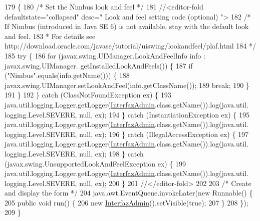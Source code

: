 \begin{DoxyCode}
179                                            \{
180         \textcolor{comment}{/* Set the Nimbus look and feel */}
181         \textcolor{comment}{//<editor-fold defaultstate="collapsed" desc=" Look and feel setting code (optional) ">}
182         \textcolor{comment}{/* If Nimbus (introduced in Java SE 6) is not available, stay with the default look and feel.}
183 \textcolor{comment}{         * For details see http://download.oracle.com/javase/tutorial/uiswing/lookandfeel/plaf.html }
184 \textcolor{comment}{         */}
185         \textcolor{keywordflow}{try} \{
186             \textcolor{keywordflow}{for} (javax.swing.UIManager.LookAndFeelInfo info : javax.swing.UIManager.
      getInstalledLookAndFeels()) \{
187                 \textcolor{keywordflow}{if} (\textcolor{stringliteral}{"Nimbus"}.equals(info.getName())) \{
188                     javax.swing.UIManager.setLookAndFeel(info.getClassName());
189                     \textcolor{keywordflow}{break};
190                 \}
191             \}
192         \} \textcolor{keywordflow}{catch} (ClassNotFoundException ex) \{
193             java.util.logging.Logger.getLogger(\mbox{\hyperlink{class_interfaz_package_1_1_interfaz_admin_a314844323c7cc2133f2e6e27e437f3c7}{InterfazAdmin}}.class.getName()).log(java.util.
      logging.Level.SEVERE, null, ex);
194         \} \textcolor{keywordflow}{catch} (InstantiationException ex) \{
195             java.util.logging.Logger.getLogger(\mbox{\hyperlink{class_interfaz_package_1_1_interfaz_admin_a314844323c7cc2133f2e6e27e437f3c7}{InterfazAdmin}}.class.getName()).log(java.util.
      logging.Level.SEVERE, null, ex);
196         \} \textcolor{keywordflow}{catch} (IllegalAccessException ex) \{
197             java.util.logging.Logger.getLogger(\mbox{\hyperlink{class_interfaz_package_1_1_interfaz_admin_a314844323c7cc2133f2e6e27e437f3c7}{InterfazAdmin}}.class.getName()).log(java.util.
      logging.Level.SEVERE, null, ex);
198         \} \textcolor{keywordflow}{catch} (javax.swing.UnsupportedLookAndFeelException ex) \{
199             java.util.logging.Logger.getLogger(\mbox{\hyperlink{class_interfaz_package_1_1_interfaz_admin_a314844323c7cc2133f2e6e27e437f3c7}{InterfazAdmin}}.class.getName()).log(java.util.
      logging.Level.SEVERE, null, ex);
200         \}
201         \textcolor{comment}{//</editor-fold>}
202 
203         \textcolor{comment}{/* Create and display the form */}
204         java.awt.EventQueue.invokeLater(\textcolor{keyword}{new} Runnable() \{
205             \textcolor{keyword}{public} \textcolor{keywordtype}{void} run() \{
206                 \textcolor{keyword}{new} \mbox{\hyperlink{class_interfaz_package_1_1_interfaz_admin_a314844323c7cc2133f2e6e27e437f3c7}{InterfazAdmin}}().setVisible(\textcolor{keyword}{true});
207             \}
208         \});
209     \}
\end{DoxyCode}


